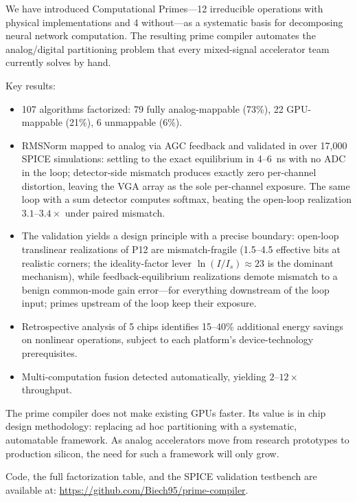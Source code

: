 \documentclass[11pt]{article}
\begin{document}
We have introduced Computational Primes---12 irreducible operations with physical implementations and 4 without---as a systematic basis for decomposing neural network computation. The resulting prime compiler automates the analog/digital partitioning problem that every mixed-signal accelerator team currently solves by hand.

Key results:
\begin{itemize}[leftmargin=*]
\item 107 algorithms factorized: 79 fully analog-mappable (73\%), 22 GPU-mappable (21\%), 6 unmappable (6\%).
\item RMSNorm mapped to analog via AGC feedback and validated in over 17{,}000 SPICE simulations: settling to the exact equilibrium in 4--6~ns with no ADC in the loop; detector-side mismatch produces exactly zero per-channel distortion, leaving the VGA array as the sole per-channel exposure. The same loop with a sum detector computes softmax, beating the open-loop realization $3.1$--$3.4\times$ under paired mismatch.
\item The validation yields a design principle with a precise boundary: open-loop translinear realizations of P12 are mismatch-fragile (1.5--4.5 effective bits at realistic corners; the ideality-factor lever $\ln(I/I_s) \approx 23$ is the dominant mechanism), while feedback-equilibrium realizations demote mismatch to a benign common-mode gain error---for everything downstream of the loop input; primes upstream of the loop keep their exposure.
\item Retrospective analysis of 5 chips identifies 15--40\% additional energy savings on nonlinear operations, subject to each platform's device-technology prerequisites.
\item Multi-computation fusion detected automatically, yielding $2$--$12\times$ throughput.
\end{itemize}

The prime compiler does not make existing GPUs faster. Its value is in chip design methodology: replacing ad hoc partitioning with a systematic, automatable framework. As analog accelerators move from research prototypes to production silicon, the need for such a framework will only grow.

Code, the full factorization table, and the SPICE validation testbench are available at: \url{https://github.com/Biech95/prime-compiler}.
\end{document}
